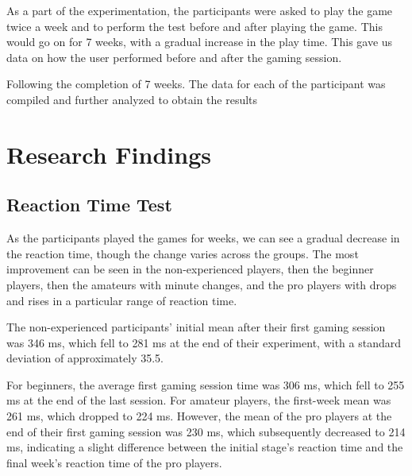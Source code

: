 \documentclass[conference]{IEEEtran}
\begin{document}
\newline
\newline
\RaggedRight As a part of the experimentation, the participants were asked to play the game twice a week and to perform the test before and after playing the game. This would go on for 7 weeks, with a gradual increase in the play time. This gave us data on how the user performed before and after the gaming session.
 
\newline\newline \newline

\RaggedRight Following the completion of 7 weeks. The data for each of the participant was compiled and further analyzed to obtain the results

\section{Research Findings}
\begin{flushleft}
    \subsection{Reaction Time Test}
    As the participants played the games for weeks, we can see a gradual decrease in the reaction time, though the change varies across the groups. The most improvement can be seen in the non-experienced players, then the beginner players, then the amateurs with minute changes, and the pro players with drops and rises in a particular range of reaction time.
\end{flushleft}
\newline
\newline
The non-experienced participants' initial mean after their first gaming session was 346 ms, which fell to 281 ms at the end of their experiment, with a standard deviation of approximately 35.5.
\newline
\begin{flushleft}
    For beginners, the average first gaming session time was 306 ms, which fell to 255 ms at the end of the last session. For amateur players, the first-week mean was 261 ms, which dropped to 224 ms. However, the mean of the pro players at the end of their first gaming session was 230 ms, which subsequently decreased to 214 ms, indicating a slight difference between the initial stage's reaction time and the final week's reaction time of the pro players.
\end{flushleft}
\end{document}
